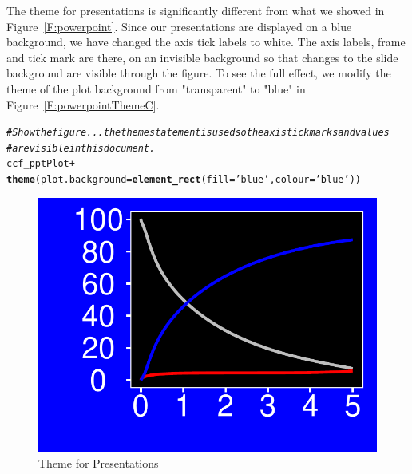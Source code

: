\documentclass[nojss, letterpaper]{jss}\usepackage[]{graphicx}\usepackage[]{color}
\makeatletter
\def\maxwidth{ %
  \ifdim\Gin@nat@width>\linewidth
    \linewidth
  \else
    \Gin@nat@width
  \fi
}
\newcommand{\hlstr}[1]{\textcolor[rgb]{0.192,0.494,0.8}{#1}}%
\newcommand{\hlcom}[1]{\textcolor[rgb]{0.678,0.584,0.686}{\textit{#1}}}%
\newcommand{\hlopt}[1]{\textcolor[rgb]{0,0,0}{#1}}%
\newcommand{\hlstd}[1]{\textcolor[rgb]{0.345,0.345,0.345}{#1}}%
\newcommand{\hlkwc}[1]{\textcolor[rgb]{0.333,0.667,0.333}{#1}}%
\newcommand{\hlkwd}[1]{\textcolor[rgb]{0.737,0.353,0.396}{\textbf{#1}}}%
\newenvironment{kframe}{%
 \def\at@end@of@kframe{}%
 \ifinner\ifhmode%
  \def\at@end@of@kframe{\end{minipage}}%
  \begin{minipage}{\columnwidth}%
 \fi\fi%
 \def\FrameCommand##1{\hskip\@totalleftmargin \hskip-\fboxsep
 \colorbox{shadecolor}{##1}\hskip-\fboxsep
     \hskip-\linewidth \hskip-\@totalleftmargin \hskip\columnwidth}%
 \MakeFramed {\advance\hsize-\width
   \@totalleftmargin\z@ \linewidth\hsize
   \@setminipage}}%
 {\par\unskip\endMakeFramed%
 \at@end@of@kframe}
\newenvironment{knitrout}{}{} %
\makeatother
\begin{document}
The theme for presentations is significantly different from what we showed in Figure~\ref{F:powerpoint}. Since our presentations are displayed on a blue background, we have changed the axis tick labels to white. The axis labels, frame and tick mark are there, on an invisible background so that changes to the slide background are visible through the figure.  To see the full effect, we modify the theme of the plot background from "transparent" to "blue" in Figure~\ref{F:powerpointThemeC}.
\begin{knitrout}\footnotesize
{}\color{fgcolor}\begin{kframe}
\begin{alltt}
\hlcom{# Show the figure... the theme statement is used so the axis tick marks and values}
\hlcom{# are visible in this document.}
\hlstd{ccf_pptPlot} \hlopt{+}
  \hlkwd{theme}\hlstd{(}\hlkwc{plot.background} \hlstd{=} \hlkwd{element_rect}\hlstd{(}\hlkwc{fill}\hlstd{=}\hlstr{'blue'}\hlstd{,} \hlkwc{colour}\hlstd{=}\hlstr{'blue'}\hlstd{))}
\end{alltt}
\end{kframe}\begin{figure}[htpb]


{\centering \includegraphics[width=\maxwidth]{figure/beamer-powerpointTheme} 

}

\caption[Theme for Presentations]{Theme for Presentations\label{F:powerpointTheme}}
\end{figure}


\end{knitrout}
\end{document}
